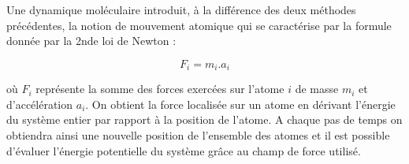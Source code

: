 Une dynamique moléculaire introduit, à la différence des deux méthodes précédentes, la notion de mouvement atomique qui se caractérise par la formule donnée par la 2nde loi de Newton :

$$F_i = m_i.a_i$$

où $F_i$ représente la somme des forces exercées sur l'atome $i$ de masse $m_i$ et d'accélération $a_i$. On obtient la force localisée sur un atome en dérivant l'énergie du système entier par rapport à la position de l'atome. A chaque pas de temps on obtiendra ainsi une nouvelle position de l'ensemble des atomes et il est possible d'évaluer l'énergie potentielle du système grâce au champ de force utilisé.



